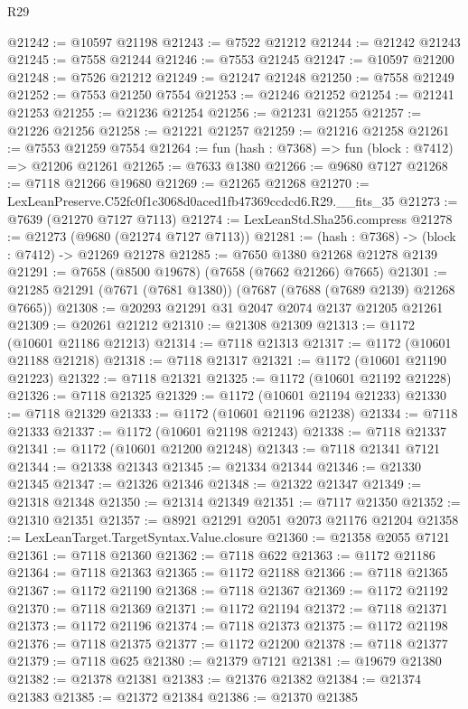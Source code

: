 \begin{lexlean}{R29}
\begin{coremodule}
@21242 := @10597 @21198
@21243 := @7522 @21212
@21244 := @21242 @21243
@21245 := @7558 @21244
@21246 := @7553 @21245
@21247 := @10597 @21200
@21248 := @7526 @21212
@21249 := @21247 @21248
@21250 := @7558 @21249
@21252 := @7553 @21250 @7554
@21253 := @21246 @21252
@21254 := @21241 @21253
@21255 := @21236 @21254
@21256 := @21231 @21255
@21257 := @21226 @21256
@21258 := @21221 @21257
@21259 := @21216 @21258
@21261 := @7553 @21259 @7554
@21264 := fun (hash : @7368) => fun (block : @7412) => @21206 @21261
@21265 := @7633 @1380
@21266 := @9680 @7127
@21268 := @7118 @21266 @19680
@21269 := @21265 @21268
@21270 := LexLeanPreserve.C52fc0f1c3068d0aced1fb47369ccdcd6.R29.__fits_35
@21273 := @7639 (@21270 @7127 @7113)
@21274 := LexLeanStd.Sha256.compress
@21278 := @21273 (@9680 (@21274 @7127 @7113))
@21281 := (hash : @7368) -> (block : @7412) -> @21269 @21278
@21285 := @7650 @1380 @21268 @21278 @2139
@21291 := @7658 (@8500 @19678) (@7658 (@7662 @21266) @7665)
@21301 := @21285 @21291 (@7671 (@7681 @1380)) (@7687 (@7688 (@7689 @2139) @21268 @7665))
@21308 := @20293 @21291 @31 @2047 @2074 @2137 @21205 @21261
@21309 := @20261 @21212
@21310 := @21308 @21309
@21313 := @1172 (@10601 @21186 @21213)
@21314 := @7118 @21313
@21317 := @1172 (@10601 @21188 @21218)
@21318 := @7118 @21317
@21321 := @1172 (@10601 @21190 @21223)
@21322 := @7118 @21321
@21325 := @1172 (@10601 @21192 @21228)
@21326 := @7118 @21325
@21329 := @1172 (@10601 @21194 @21233)
@21330 := @7118 @21329
@21333 := @1172 (@10601 @21196 @21238)
@21334 := @7118 @21333
@21337 := @1172 (@10601 @21198 @21243)
@21338 := @7118 @21337
@21341 := @1172 (@10601 @21200 @21248)
@21343 := @7118 @21341 @7121
@21344 := @21338 @21343
@21345 := @21334 @21344
@21346 := @21330 @21345
@21347 := @21326 @21346
@21348 := @21322 @21347
@21349 := @21318 @21348
@21350 := @21314 @21349
@21351 := @7117 @21350
@21352 := @21310 @21351
@21357 := @8921 @21291 @2051 @2073 @21176 @21204
@21358 := LexLeanTarget.TargetSyntax.Value.closure
@21360 := @21358 @2055 @7121
@21361 := @7118 @21360
@21362 := @7118 @622
@21363 := @1172 @21186
@21364 := @7118 @21363
@21365 := @1172 @21188
@21366 := @7118 @21365
@21367 := @1172 @21190
@21368 := @7118 @21367
@21369 := @1172 @21192
@21370 := @7118 @21369
@21371 := @1172 @21194
@21372 := @7118 @21371
@21373 := @1172 @21196
@21374 := @7118 @21373
@21375 := @1172 @21198
@21376 := @7118 @21375
@21377 := @1172 @21200
@21378 := @7118 @21377
@21379 := @7118 @625
@21380 := @21379 @7121
@21381 := @19679 @21380
@21382 := @21378 @21381
@21383 := @21376 @21382
@21384 := @21374 @21383
@21385 := @21372 @21384
@21386 := @21370 @21385

\end{coremodule}
\end{lexlean}
